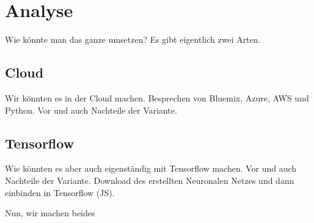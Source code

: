 \section{Analyse}
Wie könnte man das ganze umsetzen? Es gibt eigentlich zwei Arten.

\subsection{Cloud}
Wir könnten es in der Cloud machen. Besprechen von Bluemix, Azure, AWS und Python. Vor und auch Nachteile der Variante.

\subsection{Tensorflow}
Wie könnten es aber auch eigenständig mit Tensorflow machen. Vor und auch Nachteile der Variante. Download des erstellten
Neuronalen Netzes und dann einbinden in Tensorflow (JS).

Nun, wir machen beides
